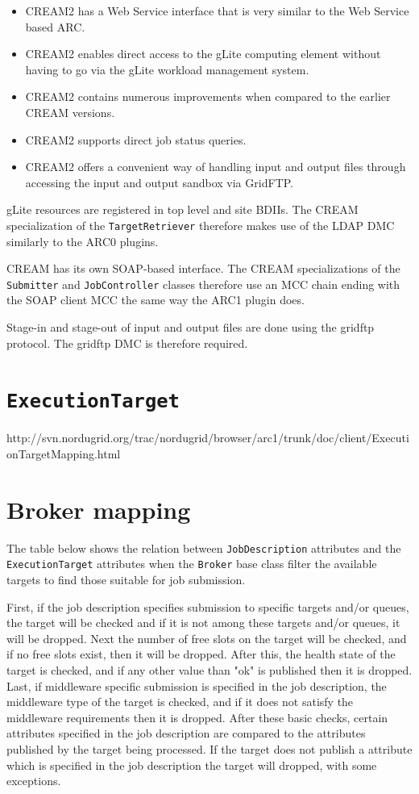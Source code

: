 \documentclass{book}
\newcommand{\Broker}{\texttt{Broker}}
\newcommand{\ExecutionTarget}{\texttt{ExecutionTarget}}
\newcommand{\JobController}{\texttt{JobController}}
\newcommand{\JobDescription}{\texttt{JobDescription}}
\newcommand{\TargetRetriever}{\texttt{TargetRetriever}}
\newcommand{\Submitter}{\texttt{Submitter}}
\begin{document}
\begin{itemize}
\item CREAM2 has a Web Service interface that is very similar to the Web Service
  based ARC.
\item CREAM2 enables direct access to the gLite computing element
  without having to go via the gLite workload management system.
\item CREAM2 contains numerous improvements when compared to the
  earlier CREAM versions.
\item CREAM2 supports direct job status queries.
\item CREAM2 offers a convenient way of handling input and output
  files through accessing the input and output sandbox via GridFTP.
\end{itemize}

gLite resources are registered in top level and site BDIIs. The CREAM
specialization of the {\TargetRetriever} therefore makes use of the
LDAP DMC similarly to the ARC0 plugins.

CREAM has its own SOAP-based interface. The CREAM
specializations of the {\Submitter} and {\JobController} classes
therefore use an MCC chain ending with the SOAP client MCC the same
way the ARC1 plugin does.

Stage-in and stage-out of input and output files are done using the
gridftp protocol. The gridftp DMC is therefore required.

\appendix

\chapter{{\ExecutionTarget}}
\label{app:ExTarget}

http://svn.nordugrid.org/trac/nordugrid/browser/arc1/trunk/doc/client/ExecutionTargetMapping.html

\chapter{Broker mapping}
\label{app:broker-mapping}
The table below shows the relation between {\JobDescription}
attributes and the {\ExecutionTarget} attributes when the {\Broker}
base class filter the available targets to find those suitable for job
submission.

First, if the job description specifies submission to specific targets
and/or queues, the target will be checked and if it is not among these
targets and/or queues, it will be dropped. Next the number of free
slots on the target will be checked, and if no free slots exist, then
it will be dropped. After this, the health state of the target is
checked, and if any other value than "ok" is published then it is
dropped. Last, if middleware specific submission is specified in the
job description, the middleware type of the target is checked, and if
it does not satisfy the middleware requirements then it is
dropped. After these basic checks, certain attributes specified in the
job description are compared to the attributes published by the target
being processed. If the target does not publish a attribute which is
specified in the job description the target will dropped, with some
exceptions.
\end{document}
